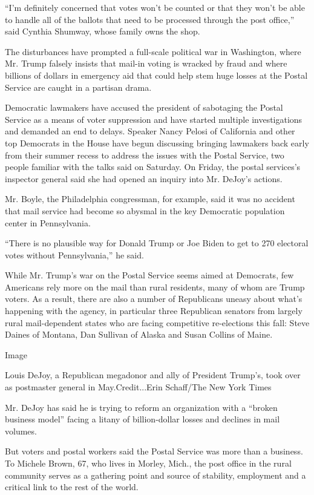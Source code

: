 ``I'm definitely concerned that votes won't be counted or that they
won't be able to handle all of the ballots that need to be processed
through the post office,'' said Cynthia Shumway, whose family owns the
shop.

The disturbances have prompted a full-scale political war in Washington,
where Mr. Trump falsely insists that mail-in voting is wracked by fraud
and where billions of dollars in emergency aid that could help stem huge
losses at the Postal Service are caught in a partisan drama.

Democratic lawmakers have accused the president of sabotaging the Postal
Service as a means of voter suppression and have started multiple
investigations and demanded an end to delays. Speaker Nancy Pelosi of
California and other top Democrats in the House have begun discussing
bringing lawmakers back early from their summer recess to address the
issues with the Postal Service, two people familiar with the talks said
on Saturday. On Friday, the postal services's inspector general said she
had opened an inquiry into Mr. DeJoy's actions.

Mr. Boyle, the Philadelphia congressman, for example, said it was no
accident that mail service had become so abysmal in the key Democratic
population center in Pennsylvania.

``There is no plausible way for Donald Trump or Joe Biden to get to 270
electoral votes without Pennsylvania,'' he said.

While Mr. Trump's war on the Postal Service seems aimed at Democrats,
few Americans rely more on the mail than rural residents, many of whom
are Trump voters. As a result, there are also a number of Republicans
uneasy about what's happening with the agency, in particular three
Republican senators from largely rural mail-dependent states who are
facing competitive re-elections this fall: Steve Daines of Montana, Dan
Sullivan of Alaska and Susan Collins of Maine.

Image

Louis DeJoy, a Republican megadonor and ally of President Trump's, took
over as postmaster general in May.Credit...Erin Schaff/The New York
Times

Mr. DeJoy has said he is trying to reform an organization with a
``broken business model'' facing a litany of billion-dollar losses and
declines in mail volumes.

But voters and postal workers said the Postal Service was more than a
business. To Michele Brown, 67, who lives in Morley, Mich., the post
office in the rural community serves as a gathering point and source of
stability, employment and a critical link to the rest of the world.

